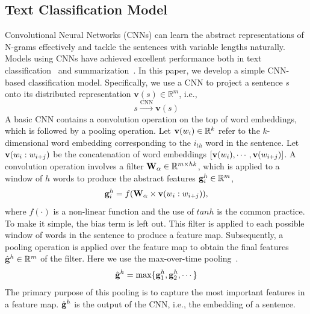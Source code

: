 \documentclass[letterpaper]{article}
\begin{document}
\subsection{Text Classification Model}
Convolutional Neural Networks (CNNs) can learn the abstract representations of N-grams effectively and tackle the sentences with variable lengths naturally.
Models using CNNs have achieved excellent performance both in text classification~\cite{lai2015recurrent} and summarization~\cite{yin2015optimizing}.
In this paper, we develop a simple CNN-based classification model.
Specifically, we use a CNN to project a sentence $s$ onto its distributed representation ${\mathbf{v}}(s) \in \mathbb{R}^m$, i.e., 
\begin{equation} \label{eq:sentenceEmbedding}
s\xrightarrow{{{\text{CNN}}}}{\mathbf{v}}(s)
\end{equation}
A basic CNN contains a convolution operation on the top of word embeddings, which is followed by a pooling operation.
Let ${\bf{v}}(w_i) \in \mathbb{R}^k$ refer to the $k$-dimensional word embedding corresponding to the $i_{th}$ word in the sentence. 
Let ${\bf{v}}(w_i : w_{i+j})$ be the concatenation of word embeddings
$[{\bf{v}}(w_i),\cdots,{\bf{v}}(w_{i+j})]$. 
A convolution operation involves a filter ${\bf{W}}_\alpha \in \mathbb{R}^{m \times hk}$, which is applied to a window of $h$ words to produce the abstract features ${\bf{g}}_i^h \in \mathbb{R}^m$,
\begin{equation}\label{EQ:filter}
{\bf{g}}_i^h = f({\bf{W}}_ \alpha \times {\bf{v}}(w_i : w_{i+j})),
\end{equation}
where $f(\cdot)$ is a non-linear function and  the use of $tanh$ is the common practice. 
To make it simple, the bias term is left out.
This filter is applied to each possible window of words in the sentence to produce a feature map.
Subsequently, a pooling operation is applied over the feature map to obtain the final features $\hat{\bf{g}}^h \in \mathbb{R}^m$ of the filter.
Here we use the max-over-time pooling~\cite{Collobert2011}.
\begin{equation}
\hat{\bf{g}}^h=\max\{{\bf{g}}_1^h, {\bf{g}}_2^h,\cdots\}
\end{equation}
The primary purpose of this pooling is to capture the most important features in a feature map.
$\hat{\bf{g}}^h$ is the output of the CNN, i.e., the embedding of a sentence.
\end{document}
